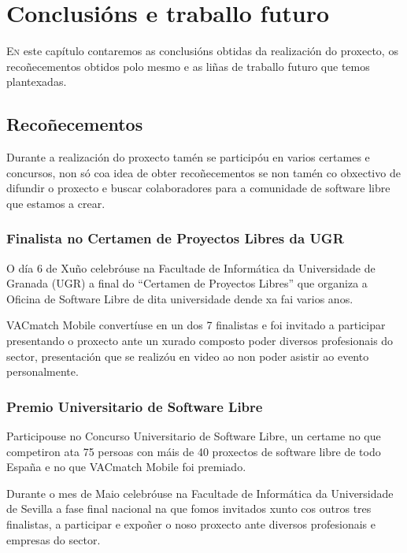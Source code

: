 \chapter{Conclusións e traballo futuro}
\minitoc


  \lettrine{E}{n} este capítulo contaremos as conclusións obtidas da 
realización do proxecto, os recoñecementos obtidos polo mesmo e as liñas de 
traballo futuro que temos plantexadas.

\section{Recoñecementos}

Durante a realización do proxecto tamén se participóu en varios certames e 
concursos, non só coa idea de obter recoñecementos se non tamén co obxectivo de 
difundir o proxecto e buscar colaboradores para a comunidade de software libre 
que estamos a crear.

  \subsection{Finalista no Certamen de Proyectos Libres da UGR}
  O día 6 de Xuño celebróuse na Facultade de Informática da Universidade de 
Granada (UGR) a final do ``Certamen de Proyectos Libres'' que organiza a 
Oficina de Software Libre de dita universidade dende xa fai varios anos.

  VACmatch Mobile convertíuse en un dos 7 finalistas e foi invitado a 
participar presentando o proxecto ante un xurado composto poder diversos 
profesionais do sector, presentación que se realizóu en video ao non 
poder asistir ao evento personalmente.

  \subsection{Premio Universitario de Software Libre}
  Participouse no Concurso Universitario de Software Libre, un certame no que 
competiron ata 75 persoas con máis de 40 proxectos de software libre de todo 
España e no que VACmatch Mobile foi premiado.

  Durante o mes de Maio celebróuse na Facultade de Informática da Universidade 
de Sevilla a fase final nacional na que fomos invitados xunto cos 
outros tres finalistas, a participar e expoñer o noso proxecto ante diversos 
profesionais e empresas do sector.

